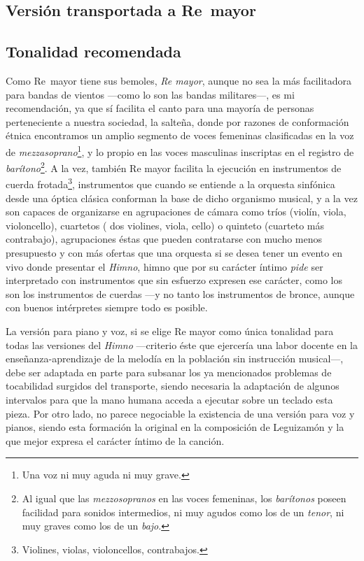 
\subsection[Versión transportada a Re\bemoltxt\ mayor]{Versión transportada a Re\bemol\ mayor}
\label{subsec:transporte-reb}



\subsection{Tonalidad recomendada}
\label{subsec:tonalidad-recomendada}

Como Re\bemoltxt\ mayor tiene sus bemoles, \emph{Re mayor}, aunque no sea la más facilitadora para bandas de vientos ---como lo son las bandas militares---, es mi recomendación, ya que sí facilita el canto para una mayoría de personas perteneciente a nuestra sociedad, la salteña, donde por razones de conformación étnica encontramos un amplio segmento de voces femeninas clasificadas en la voz de \emph{mezzasoprano}\footnote{Una voz ni muy aguda ni muy grave.}, y lo propio en las voces masculinas inscriptas en el registro de \emph{barítono}\footnote{Al igual que las \emph{mezzosopranos} en las voces femeninas, los \emph{barítonos} poseen facilidad para sonidos intermedios, ni muy agudos como los de un \emph{tenor}, ni muy graves como los de un \emph{bajo}.}. A la vez, también Re mayor facilita la ejecución en instrumentos de cuerda frotada\footnote{Violines, violas, violoncellos, contrabajos.}, instrumentos que cuando se entiende a la orquesta sinfónica desde una óptica clásica conforman la base de dicho organismo musical, y a la vez son capaces de organizarse en agrupaciones de cámara como tríos (violín, viola, violoncello), cuartetos ( dos violines, viola, cello) o quinteto (cuarteto más contrabajo), agrupaciones éstas que pueden contratarse con mucho menos presupuesto y con más ofertas que una orquesta si se desea tener un evento en vivo donde presentar el \emph{Himno}, himno que por su carácter íntimo \emph{pide} ser interpretado con instrumentos que sin esfuerzo expresen ese carácter, como los son los instrumentos de cuerdas ---y no tanto los instrumentos de bronce, aunque con buenos intérpretes siempre todo es posible.

La versión para piano y voz, si se elige Re mayor como única tonalidad para todas las versiones del \emph{Himno} ---criterio éste que ejercería una labor docente en la enseñanza-aprendizaje de la melodía en la población sin instrucción musical---, debe ser adaptada en parte para subsanar los ya mencionados problemas de tocabilidad surgidos del transporte, siendo necesaria la adaptación de algunos intervalos para que la mano humana acceda a ejecutar sobre un teclado esta pieza. Por otro lado, no parece negociable la existencia de una versión para voz y pianos, siendo esta formación la original en la composición de Leguizamón y la que mejor expresa el carácter íntimo de la canción.


